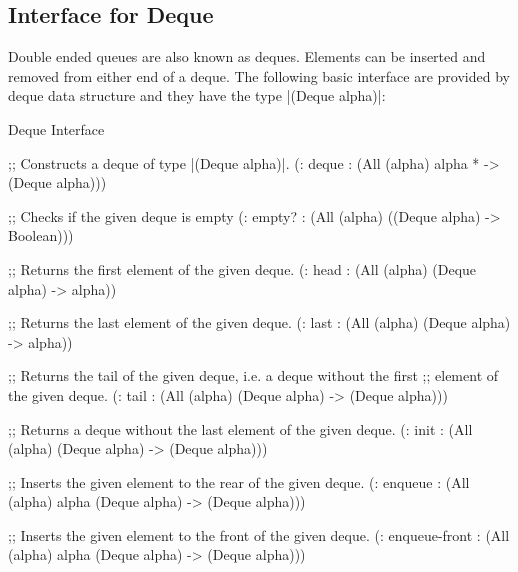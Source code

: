 
% 
% 



\subsection{Interface for Deque}
Double ended queues are also known as deques. Elements can be inserted
and removed from either end of a deque. The following basic interface
are provided by deque data structure and they have the type
\scheme|(Deque alpha)|:

\begin{file}{Deque Interface}
  \begin{schemedisplay}
    ;; Constructs a deque of type \scheme|(Deque alpha)|.
    (: deque : (All (alpha) alpha * -> (Deque alpha)))

    ;; Checks if the given deque is empty
    (: empty? : (All (alpha) ((Deque alpha) -> Boolean)))

    ;; Returns the first element of the given deque.
    (: head : (All (alpha) (Deque alpha) -> alpha))


    ;; Returns the last element of the given deque.
    (: last : (All (alpha) (Deque alpha) -> alpha))


    ;; Returns the tail of the given deque, i.e. a deque without the first
    ;; element of the given deque.
    (: tail : (All (alpha) (Deque alpha) -> (Deque alpha)))


    ;; Returns a deque without the last element of the given deque.
    (: init : (All (alpha) (Deque alpha) -> (Deque alpha)))


    ;; Inserts the given element to the rear of the given deque.
    (: enqueue : (All (alpha) alpha (Deque alpha) -> (Deque alpha)))


    ;; Inserts the given element to the front of the given deque.
    (: enqueue-front : (All (alpha) alpha (Deque alpha) -> (Deque alpha)))

  \end{schemedisplay}
\end{file}
  
